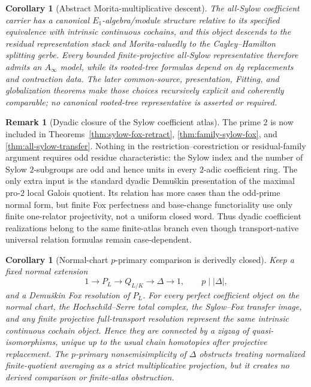 \documentclass[11pt]{article}
\newtheorem{corollary}[theorem]{Corollary}
\theoremstyle{definition}
\newtheorem{remark}[theorem]{Remark}
\begin{document}
\begin{corollary}[Abstract Morita-multiplicative descent]\label{cor:abstract-morita-multiplicative}
The all-Sylow coefficient carrier has a canonical $E_1$-algebra/module structure relative to its specified equivalence with intrinsic continuous cochains, and this object descends to the residual representation stack and Morita-valuedly to the Cayley--Hamilton splitting gerbe.  Every bounded finite-projective all-Sylow representative therefore admits an $A_\infty$ model, while its rooted-tree formulas depend on dg replacements and contraction data.  The later common-source, presentation, Fitting, and globalization theorems make those choices recursively explicit and coherently comparable; no canonical rooted-tree representative is asserted or required.
\end{corollary}

\begin{remark}[Dyadic closure of the Sylow coefficient atlas]\label{rem:sylow-two}
The prime $2$ is now included in Theorems~\ref{thm:sylow-fox-retract}, \ref{thm:family-sylow-fox}, and \ref{thm:all-sylow-transfer}.  Nothing in the restriction--corestriction or residual-family argument requires odd residue characteristic: the Sylow index and the number of Sylow $2$-subgroups are odd and hence units in every $2$-adic coefficient ring.  The only extra input is the standard dyadic Demu\v{s}kin presentation of the maximal pro-$2$ local Galois quotient.  Its relation has more cases than the odd-prime normal form, but finite Fox perfectness and base-change functoriality use only finite one-relator projectivity, not a uniform closed word.  Thus dyadic coefficient realizations belong to the same finite-atlas branch even though transport-native universal relation formulas remain case-dependent.
\end{remark}

\begin{corollary}[Normal-chart $p$-primary comparison is derivedly closed]\label{cor:normal-p-primary-derived-comparison}
Keep a fixed normal extension
\[
1\to P_L\to Q_{L/K}\to\Delta\to1,
\qquad p\mid|\Delta|,
\]
and a Demu\v{s}kin Fox resolution of $P_L$.  For every perfect coefficient object on the normal chart, the Hochschild--Serre total complex, the Sylow--Fox transfer image, and any finite projective full-transport resolution represent the same intrinsic continuous cochain object.  Hence they are connected by a zigzag of quasi-isomorphisms, unique up to the usual chain homotopies after projective replacement.  The $p$-primary nonsemisimplicity of $\Delta$ obstructs treating normalized finite-quotient averaging as a strict multiplicative projection, but it creates no derived comparison or finite-atlas obstruction.
\end{corollary}
\end{document}
